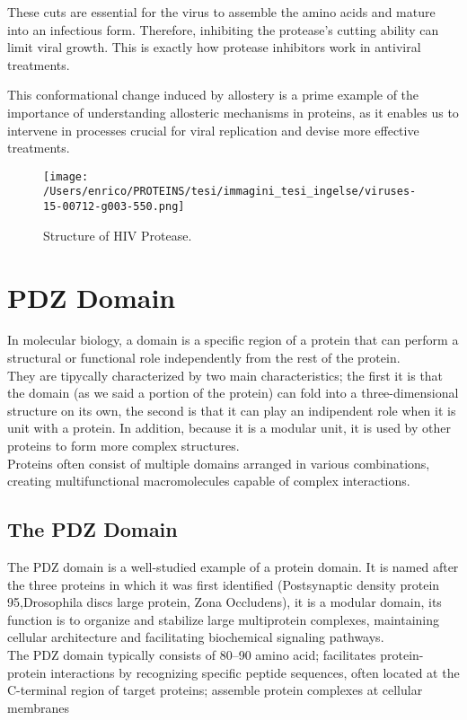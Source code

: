 \documentclass[English, Lau, oneside]{sapthesis}
\begin{document}
These cuts are essential for the virus to assemble the amino acids and mature into an infectious form. Therefore, inhibiting the protease's cutting ability can limit viral growth. This is exactly how protease inhibitors work in antiviral treatments.

This conformational change induced by allostery is a prime example of the importance of understanding allosteric mechanisms in proteins, as it enables us to intervene in processes crucial for viral replication and devise more effective treatments.

\begin{figure}[h]
    \centering
    \texttt{[image: /Users/enrico/PROTEINS/tesi/immagini\_tesi\_ingelse/viruses-15-00712-g003-550.png]}
    \caption{Structure of HIV Protease.}
    \label{fig:HIV}
\end{figure}



\newpage


\section{PDZ Domain}
\noindent 
In molecular biology, a domain is a specific region of a protein that can perform a structural or functional role independently from the rest of the protein.\cite{ref8} \\
They are tipycally characterized by two main characteristics; the first it is that the domain (as we said a portion of the protein) can fold into a three-dimensional structure on its own, the second is that it can play an indipendent role when it is unit with a protein.
In addition, because it is a modular unit, it is used by other proteins to form more complex structures.\cite{ref8} \\
Proteins often consist of multiple domains arranged in various combinations, creating multifunctional macromolecules capable of complex interactions. 


\subsection{The PDZ Domain}
\noindent The PDZ domain is a well-studied example of a protein domain. 
It is named after the three proteins in which it was first identified (Postsynaptic density protein 95,Drosophila discs large protein, Zona Occludens), it is a modular domain, its function is to organize and stabilize large multiprotein complexes, maintaining cellular architecture and facilitating biochemical signaling pathways. \cite{ref8}\\
The PDZ domain typically consists of 80--90 amino acid; facilitates protein-protein interactions by recognizing specific peptide sequences, often located at the C-terminal region of target proteins; assemble protein complexes at cellular membranes
\end{document}
